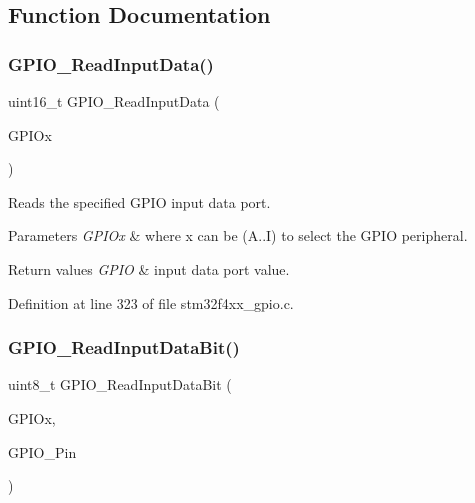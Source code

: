 \subsection{Function Documentation}
\mbox{\label{group___g_p_i_o___group2_ga139a33adc8409288e9f193bbebb5a0f7}} 
\subsubsection{\texorpdfstring{G\+P\+I\+O\+\_\+\+Read\+Input\+Data()}{GPIO\_ReadInputData()}}
{\footnotesize\ttfamily uint16\+\_\+t G\+P\+I\+O\+\_\+\+Read\+Input\+Data (\begin{DoxyParamCaption}\item[{\hyperlink{struct_g_p_i_o___type_def}{G\+P\+I\+O\+\_\+\+Type\+Def} $\ast$}]{G\+P\+I\+Ox }\end{DoxyParamCaption})}



Reads the specified G\+P\+IO input data port. 


\begin{DoxyParams}{Parameters}
{\em G\+P\+I\+Ox} & where x can be (A..I) to select the G\+P\+IO peripheral. \\
\hline
\end{DoxyParams}

\begin{DoxyRetVals}{Return values}
{\em G\+P\+IO} & input data port value. \\
\hline
\end{DoxyRetVals}


Definition at line 323 of file stm32f4xx\+\_\+gpio.\+c.

\mbox{\label{group___g_p_i_o___group2_ga98772ef6b639b3fa06c8ae5ba28d3aaa}} 
\subsubsection{\texorpdfstring{G\+P\+I\+O\+\_\+\+Read\+Input\+Data\+Bit()}{GPIO\_ReadInputDataBit()}}
{\footnotesize\ttfamily uint8\+\_\+t G\+P\+I\+O\+\_\+\+Read\+Input\+Data\+Bit (\begin{DoxyParamCaption}\item[{\hyperlink{struct_g_p_i_o___type_def}{G\+P\+I\+O\+\_\+\+Type\+Def} $\ast$}]{G\+P\+I\+Ox,  }\item[{uint16\+\_\+t}]{G\+P\+I\+O\+\_\+\+Pin }\end{DoxyParamCaption})}



